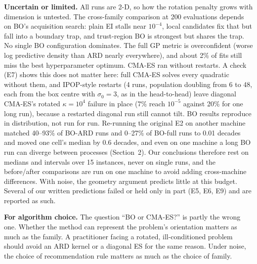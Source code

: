 \documentclass[10pt,a4paper]{article}
\begin{document}
\textbf{Uncertain or limited.} All runs are 2-D, so how the rotation penalty grows with dimension is untested. The cross-family comparison at 200 evaluations depends on BO's acquisition search: plain EI
stalls near $10^{-4}$, local candidates fix that but fall into a boundary trap, and trust-region BO is
strongest but shares the trap. No single BO configuration dominates. The full GP metric
is overconfident (worse log predictive density than ARD nearly everywhere), and about 2\% of fits still
miss the best hyperparameter optimum. CMA-ES ran without restarts. A check (E7) shows this does not matter here: full CMA-ES solves every
quadratic without them, and IPOP-style restarts (4 runs, population doubling from 6 to 48, each from the box
centre with $\sigma_0=3$, as in the head-to-head) leave diagonal
CMA-ES's rotated $\kappa=10^4$ failure in place (7\% reach $10^{-5}$ against 20\% for one long run),
because a restarted diagonal run still cannot tilt. BO results reproduce in distribution, not run for run. Re-running the original E2 on another machine
matched 40--93\% of BO-ARD runs and 0--27\% of BO-full runs to 0.01 decades and moved one cell's median
by 0.6 decades, and even on one machine a long BO run can diverge between processes (Section~2). Our
conclusions therefore rest on medians and intervals over 15 instances, never on single runs, and the
before/after comparisons are run on one machine to avoid adding cross-machine differences. With noise, the geometry argument predicts little at this budget. Several of our written predictions
failed or held only in part (E5, E6, E9) and are reported as such.

\textbf{For algorithm choice.} The question ``BO or CMA-ES?'' is partly the wrong one. Whether the
method can represent the problem's orientation matters as much as the family. A practitioner facing a
rotated, ill-conditioned problem should avoid an ARD kernel or a diagonal ES for the same reason. Under
noise, the choice of recommendation rule matters as much as the choice of family.

\small


\end{document}
